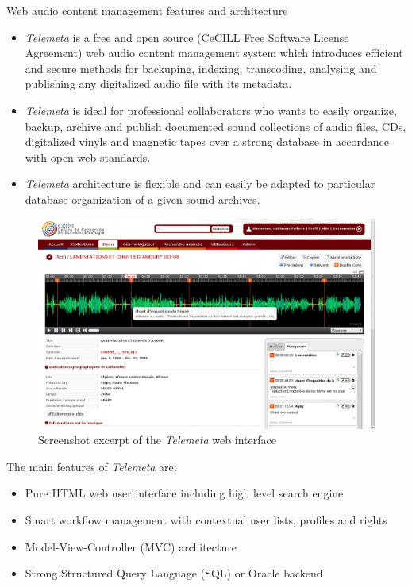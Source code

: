\documentclass[final, hyperref, table]{beamer}
\begin{document}
\begin{frame}[containsverbatim]{}
\begin{columns}[t]
\begin{column}[T]{.49\linewidth}
\begin{block}{Web audio content management features and architecture}
  \begin{itemize}
  \item \emph{Telemeta} is a free and open source ({\scriptsize CeCILL
      Free Software License Agreement}) web audio content management
    system which introduces efficient and secure methods for
    \alert{backuping}, \alert{indexing}, \alert{transcoding}, \alert{analysing} and \alert{publishing} any
    digitalized audio file with its metadata.
  \item \emph{Telemeta} is ideal for
    professional collaborators who wants to easily organize, backup, archive and
    publish documented sound collections of audio files, CDs,
    digitalized vinyls and magnetic tapes over a strong database in
    accordance with \alert{open web standards}.
  \item \emph{Telemeta} architecture
    is \alert{flexible} and can easily be adapted to particular database
    organization of a given sound archives.
  \end{itemize}

\begin{figure}[htbp]
  \centering
  \includegraphics[width=0.47\paperwidth]{img/player_mark.png}
  \caption{Screenshot excerpt of the \emph{Telemeta} web interface}
\end{figure}



The main features of \emph{Telemeta} are:
\vspace{-0.1cm}
\begin{itemize}
\item \alert{Pure HTML} web user interface including high level \alert{search engine}
\item \alert{Smart workflow management} with contextual user lists, profiles and rights
\item Model-View-Controller (\alert{MVC}) architecture 
\item Strong Structured Query Language (\alert{SQL}) or Oracle backend


\end{itemize}
\end{block}
\end{column}
\end{columns}
\end{frame}
\end{document}

